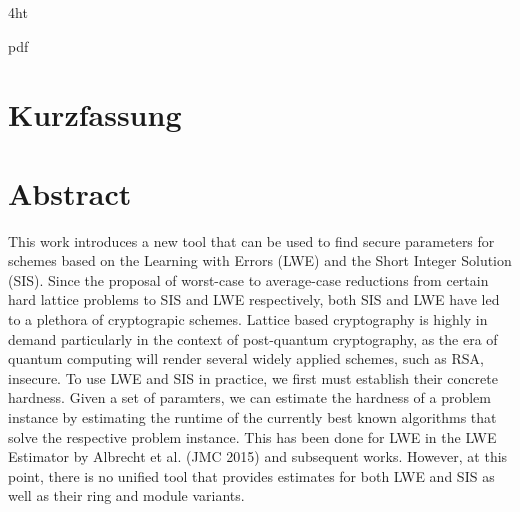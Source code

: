 \documentclass[
  a4paper,  %
  twoside,  %
  bibliography=totoc,
  headsepline,
  cleardoublepage=empty,
  parskip=half,
  draft=false
]{scrbook}
\begin{document}
\iftex4ht

  {pdf}
  {%
  }
\fi



\Titelblatt

\pagestyle{preamble}
\renewcommand*{\chapterpagestyle}{preamble}



\ifdeutsch
  \section*{Kurzfassung}
\else
  \section*{Abstract}
\fi

This work introduces a new tool that can be used to find secure parameters for schemes based on the Learning with Errors (LWE) and the Short Integer Solution (SIS). Since the proposal of worst-case to average-case reductions from certain hard lattice problems to SIS and LWE respectively, both SIS and LWE have led to a plethora of cryptograpic schemes. Lattice based cryptography is highly in demand particularly in the context of post-quantum cryptography, as the era of quantum computing will render several widely applied schemes, such as RSA, insecure. To use LWE and SIS in practice, we first must establish their concrete hardness. Given a set of paramters, we can estimate the hardness of a problem instance by estimating the runtime of the currently best known algorithms that solve the respective problem instance. This has been done for LWE in the LWE Estimator by Albrecht et al. (JMC 2015) and subsequent works. However, at this point, there is no unified tool that provides estimates for both LWE and SIS as well as their ring and module variants.
\end{document}
